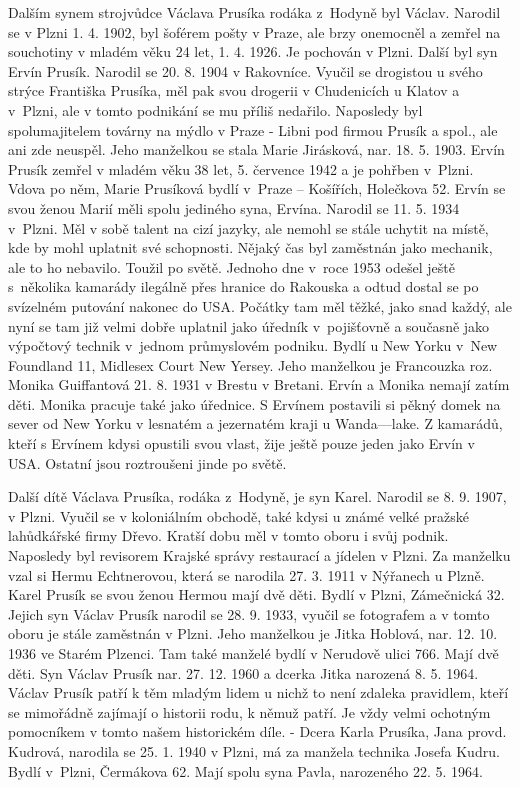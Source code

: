 \documentclass[../dejiny-rodu-prusiku.tex]{subfiles}
\begin{document}
Dalším synem strojvůdce Václava Prusíka rodáka z Hodyně byl Václav. Narodil se v Plzni 1. 4. 1902, byl šoférem pošty v Praze, ale brzy onemocněl a zemřel na souchotiny v mladém věku 24 let, 1. 4. 1926. Je pochován v Plzni. Další byl syn Ervín Prusík. Narodil se 20. 8. 1904 v Rakovníce. Vyučil se drogistou u svého strýce Františka Prusíka, měl pak svou drogerii  v Chudenicích u Klatov a v Plzni, ale v tomto podnikání se mu příliš nedařilo. Naposledy byl spolumajitelem továrny na mýdlo v Praze - Libni pod firmou Prusík a spol., ale ani zde neuspěl. Jeho manželkou se stala Marie Jirásková, nar. 18. 5. 1903. Ervín Prusík zemřel v mladém věku 38 let, 5. července 1942 a je pohřben v Plzni. Vdova po něm, Marie Prusíková bydlí v Praze – Košířích, Holečkova 52. Ervín se svou ženou Marií měli spolu jediného syna, Ervína. Narodil se 11. 5. 1934 v Plzni. Měl v sobě talent na cizí jazyky, ale nemohl se stále uchytit na místě, kde by mohl uplatnit své schopnosti. Nějaký čas byl zaměstnán jako mechanik, ale to ho nebavilo. Toužil po světě. Jednoho dne v roce 1953 odešel ještě s několika kamarády ilegálně přes hranice do Rakouska a odtud dostal se po svízelném putování nakonec do USA. Počátky tam měl těžké, jako snad každý, ale nyní se tam již velmi dobře uplatnil jako úředník v pojišťovně a současně jako výpočtový technik v jednom průmyslovém podniku. Bydlí u New Yorku v New Foundland 11, Midlesex Court New Yersey. Jeho manželkou
je Francouzka roz. Monika Guiffantová 21. 8. 1931 v Brestu v Bretani. Ervín a Monika nemají zatím děti. Monika pracuje také jako úřednice. S Ervínem postavili si pěkný domek na sever od New Yorku v lesnatém a jezernatém kraji u Wanda—lake. Z kamarádů, kteří s Ervínem kdysi opustili svou vlast, žije ještě pouze jeden jako Ervín v USA. Ostatní jsou roztroušeni jinde po světě.

Další dítě Václava Prusíka, rodáka z Hodyně, je syn Karel. Narodil se 8. 9. 1907, v Plzni. Vyučil se v koloniálním obchodě, také kdysi u známé velké pražské lahůdkářské firmy Dřevo. Kratší dobu měl v tomto oboru i svůj podnik. Naposledy byl revisorem Krajské správy restaurací a jíde­len v Plzni. Za manželku vzal si Hermu Echtnerovou, která se narodila 27. 3. 1911 v Nýřanech u Plzně. Karel Prusík se svou ženou Hermou mají dvě děti. Bydlí v Plzni, Zámečnická 32. Jejich syn Václav Prusík narodil se 28. 9. 1933, vyučil se fotografem a v tomto oboru je stále zaměstnán v Plzni. Jeho manželkou je Jitka Hoblová, nar. 12. 10. 1936 ve Starém Plzenci. Tam také manželé bydlí v Nerudově uli­ci 766. Mají dvě děti. Syn Václav Prusík nar. 27. 12. 1960 a dcerka Jitka narozená 8. 5. 1964. Václav Prusík patří k těm mladým lidem u nichž to není zdaleka pravidlem, kte­ří se mimořádně zajímají o historii rodu, k němuž patří. Je vždy velmi ochotným pomocníkem v tomto našem historickém díle. - Dcera Karla Prusíka, Jana provd. Kudrová, narodila se 25. 1. 1940 v Plzni, má za manžela technika Josefa Kudru. Bydlí v Plzni, Čermákova 62. Mají spolu syna Pavla, narozeného 22. 5. 1964.
\end{document}
